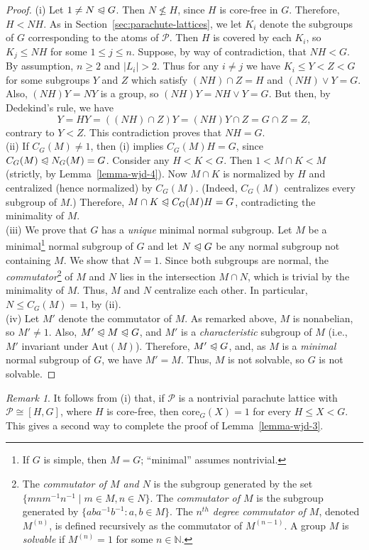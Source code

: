 \documentclass[cm,dissertation]{uhthesis}
\theoremstyle{plain}
\theoremstyle{definition}
\theoremstyle{remark}
\newtheorem*{remark}{Remark}
\numberwithin{theorem}{section}
\numberwithin{claim}{chapter}
\numberwithin{equation}{section}
\numberwithin{conjecture}{chapter}
\newcommand{\<}{\ensuremath{\langle}}
\renewcommand{\>}{\ensuremath{\rangle}}
\renewcommand{\leq}{\ensuremath{\leqslant}}
\renewcommand{\nleq}{\ensuremath{\nleqslant}}
\renewcommand{\geq}{\ensuremath{\geqslant}}
\newcommand{\subnormal}{\ensuremath{\trianglelefteqslant}}
\newcommand{\join}{\ensuremath{\vee}}
\newcommand{\N}{\ensuremath{\mathbb{N}}}   %
\newcommand{\Aut}{\ensuremath{\mathrm{Aut}}}
\newcommand{\core}{\ensuremath{\mathrm{core}}}
\newcommand{\0}{\ensuremath{\mathbf{0}}}
\newcommand{\1}{\ensuremath{\mathbf{1}}}
\newcommand{\2}{\ensuremath{\mathbf{2}}}
\newcommand{\3}{\ensuremath{\mathbf{3}}}
\newcommand{\4}{\ensuremath{\mathbf{4}}}
\newcommand{\5}{\ensuremath{\mathbf{5}}}
\newcommand{\sP}{\ensuremath{\mathscr{P}}}
\begin{document}
\begin{proof}
(i) Let $1\neq N \subnormal G$.  Then $N \nleq H$, since $H$ is core-free in $G$.
Therefore, $H < NH$.   As in Section~\ref{sec:parachute-lattices}, we let $K_i$
denote the subgroups of $G$ 
corresponding to the atoms of $\sP$.  
Then $H$ is covered by each $K_i$, so $K_j\leq NH$ for some $1\leq j\leq n$.  
Suppose, by way of contradiction, that $NH < G$.  
By assumption, $n\geq 2$ and $|L_i|>2$.  Thus for any $i\neq j$ we have
$K_i\leq Y < Z < G$ for some subgroups $Y$ and $Z$ which satisfy
$(NH)\cap Z = H$ and $(NH)\join Y = G$.  Also, $(NH)Y = NY$ is a group, so
$(NH)Y=NH\join Y = G$.  But then, by Dedekind's rule, we have
\[
Y = HY = ((NH)\cap Z) Y = (NH)Y \cap Z = G\cap Z = Z,
\]
contrary to $Y<Z$.  This contradiction proves that $NH = G$.
\\[8pt]
%
(ii) If $C_G(M)\neq 1$, then (i) implies $C_G(M)H = G$,
since $C_G(M) \subnormal N_G(M) =G$. 
Consider any $H< K < G$. Then $1 < M\cap K < M$ (strictly, by
Lemma~\ref{lemma-wjd-4}). Now $M\cap K$ is normalized by $H$ and centralized
(hence normalized) by $C_G(M)$.  (Indeed, $C_G(M)$ centralizes every subgroup of
$M$.) Therefore, $M\cap K \subnormal C_G(M)H = G$, contradicting the minimality of
$M$. 
\\[8pt]
(iii) We prove that $G$ has a \emph{unique} minimal normal subgroup.  Let $M$ be a
minimal\footnote{If $G$ is simple, then $M = G$; ``minimal'' assumes
  nontrivial.} normal subgroup of $G$ and let $N \subnormal G$ be any normal subgroup not 
containing $M$.  We show that $N = 1$.  Since both subgroups
are normal, the \emph{commutator}\footnote{The \emph{commutator of $M$ and $N$} is the subgroup
generated by the set $\{mnm^{-1}n^{-1} \mid m\in M, n\in N\}.$
The \emph{commutator of $M$} is the subgroup generated by
 $\{a b a^{-1} b^{-1}: a, b \in M\}$.  The \emph{$n^{th}$ degree
commutator of $M$}, denoted $M^{(n)}$, is defined recursively as the commutator of
$M^{(n-1)}$. A group $M$ is \emph{solvable} if $M^{(n)} = 1$ for some $n \in \N$.}
 of $M$ and $N$ %
lies in the intersection $M\cap N$, which is trivial by the minimality of $M$.   
Thus, $M$ and $N$ centralize each other.  In particular,
$N \leq C_G(M) = 1$, by (ii).
\\[8pt]
(iv) Let $M'$ denote the commutator of $M$.   As remarked above, $M$ is
nonabelian, so $M' \neq 1$.  Also, $M' \subnormal M
\subnormal G$, and $M'$ is a \emph{characteristic} subgroup of $M$ (i.e.,
$M'$ invariant under $\Aut(M)$).  Therefore, $M'\subnormal G$, and, 
as $M$ is a \emph{minimal} normal subgroup of $G$, we have $M' = M$.  Thus, $M$ is
not solvable, so $G$ is not solvable.
\end{proof}
\begin{remark}
It follows from (i) that, if $\sP$ is a nontrivial parachute lattice
with $\sP \cong [H, G]$, where $H$ is core-free, then $\core_G(X) = 1$ for every $H
\leq X < G$.  This gives a second way to complete the proof of Lemma~\ref{lemma-wjd-3}.
\end{remark}
\end{document}
